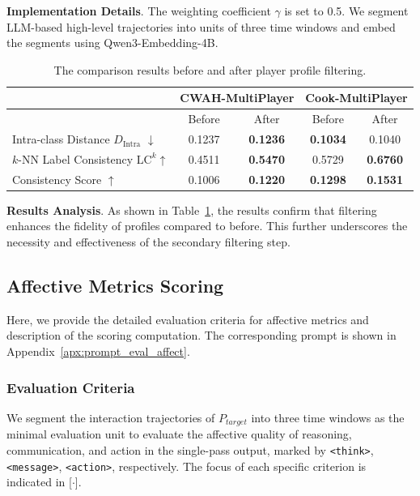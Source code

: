 \documentclass{article}
\theoremstyle{plain}
\theoremstyle{definition}
\theoremstyle{remark}
\begin{document}
\textbf{Implementation Details}. The weighting coefficient $\gamma$ is set to 0.5. We segment LLM-based high-level trajectories into units of three time windows and embed the segments using Qwen3-Embedding-4B.

\begin{table}[!htbp]
  \centering
  \caption{The comparison results before and after player profile filtering.}
    \begin{tabular}{>{\centering\arraybackslash}p{14.035em}|cc|cc}
    \toprule
    \multicolumn{1}{c|}{\multirow{2}[4]{*}{\textbf{Metrics}}} & \multicolumn{2}{c|}{\textbf{CWAH-MultiPlayer}} & \multicolumn{2}{c}{\textbf{Cook-MultiPlayer}} \\
\cmidrule{2-5}    \multicolumn{1}{c|}{} & Before & After & Before & After \\
    \midrule
    Intra-class Distance $D_\text{Intra}$ $\downarrow$ & 0.1237 & \textbf{0.1236} & \textbf{0.1034} & 0.1040 \\
    $k$-NN Label Consistency $\text{LC}^k$$\uparrow$ & 0.4511 & \textbf{0.5470} & 0.5729 & \textbf{0.6760} \\
    \midrule
    Consistency Score $\uparrow$ & 0.1006 & \textbf{0.1220} & \textbf{0.1298} & \textbf{0.1531} \\
    \bottomrule
    \end{tabular}
  \label{apx:tab:filter}
\end{table}

\textbf{Results Analysis}. As shown in Table~\ref{apx:tab:filter}, the results confirm that filtering enhances the fidelity of profiles compared to before. This further underscores the necessity and effectiveness of the secondary filtering step.


\subsection{Affective Metrics Scoring}\label{appx:llmjudge}
Here, we provide the detailed evaluation criteria for affective metrics and  description of the scoring computation. The corresponding prompt is shown in Appendix~\ref{apx:prompt_eval_affect}.

\subsubsection{Evaluation Criteria}
We segment the interaction trajectories of $P_{target}$ into three time windows as the minimal evaluation unit to evaluate the affective quality of reasoning, communication, and action in the single-pass output, marked by \texttt{<think>}, \texttt{<message>}, \texttt{<action>}, respectively. The focus of each specific criterion is indicated in [$\cdot$].
\end{document}
